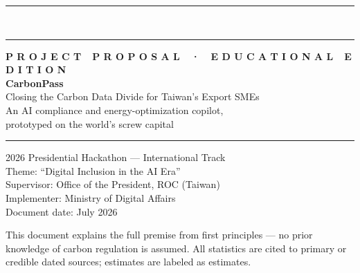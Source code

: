 \documentclass[11pt,a4paper]{article}
\begin{document}
\begin{titlepage}
\noindent
\begin{minipage}{\textwidth}
\vspace{0cm}
{\color{ink}\rule{\textwidth}{14mm}}\\[-2.5pt]
{\color{accent}\rule{\textwidth}{2.6mm}}
\end{minipage}

\vspace{2.6cm}
\begin{minipage}{0.82\textwidth}
\hspace{1.9cm}\begin{minipage}{0.88\textwidth}
{\sffamily\footnotesize\bfseries\color{accent}\MakeUppercase{P r o j e c t\ \ P r o p o s a l\ \ ·\ \ E d u c a t i o n a l\ \ E d i t i o n}}\\[9mm]
{\fontsize{30}{34}\selectfont\bfseries\color{ink}CarbonPass}\\[7mm]
{\large\color{ink!75}Closing the Carbon Data Divide for Taiwan's Export SMEs}\\[2.5mm]
{\normalsize\color{black!60}An AI compliance and energy-optimization copilot,\\prototyped on the world's screw capital}\\[15mm]
{\color{ink}\rule{2.6pt}{2.45cm}}\hspace{4mm}%
\begin{minipage}[b]{0.8\textwidth}\small
2026 Presidential Hackathon --- International Track\\
Theme: ``Digital Inclusion in the AI Era''\\
Supervisor: Office of the President, ROC (Taiwan)\\
Implementer: Ministry of Digital Affairs\\
Document date: July 2026
\end{minipage}
\end{minipage}
\end{minipage}

\vfill
\noindent
\begin{minipage}{\textwidth}
\hspace{1.9cm}\begin{minipage}{0.52\textwidth}
\footnotesize\color{black!55}
This document explains the full premise from first principles --- no prior
knowledge of carbon regulation is assumed. All statistics are cited to primary
or credible dated sources; estimates are labeled as estimates.
\end{minipage}
\hfill
\raisebox{-0.4cm}{{\color{mist}\rule{3cm}{3cm}}}\hspace{-3cm}\raisebox{-3.42cm}{{\color{ink}\rule{6.2cm}{3cm}}}
\end{minipage}
\restoregeometry
\end{titlepage}

\thispagestyle{plain}
\tableofcontents
\vspace{6mm}
\listoffigures
\listoftables
\clearpage









\end{document}
